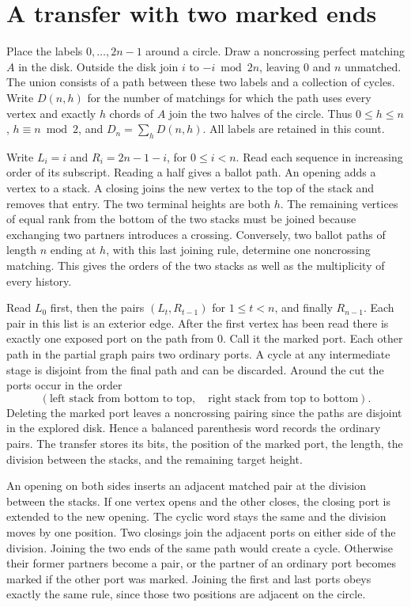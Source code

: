 \section{A transfer with two marked ends}
\label{sec:axis-transfer}

Place the labels \(0,\ldots,2n-1\) around a circle. Draw a noncrossing
perfect matching \(A\) in the disk. Outside the disk join \(i\) to
\(-i\bmod 2n\), leaving \(0\) and \(n\) unmatched. The union consists of a
path between these two labels and a collection of cycles. Write
\(D(n,h)\) for the number of matchings for which the path uses every vertex
and exactly \(h\) chords of \(A\) join the two halves of the circle. Thus
\(0\le h\le n\), \(h\equiv n\bmod 2\), and \(D_n=\sum_h D(n,h)\).
All labels are retained in this count.

Write \(L_i=i\) and \(R_i=2n-1-i\), for \(0\le i<n\). Read each sequence
in increasing order of its subscript. Reading a half gives a ballot path.
An opening adds a vertex to a stack. A closing joins the new vertex to
the top of the stack and removes that entry. The two terminal heights are
both \(h\). The remaining vertices of equal rank from the bottom of the
two stacks must be joined because exchanging two partners introduces a crossing.
Conversely, two ballot paths of length \(n\) ending at \(h\), with this
last joining rule, determine one noncrossing matching. This gives the
orders of the two stacks as well as the multiplicity of every history.

Read \(L_0\) first, then the pairs \((L_t,R_{t-1})\) for \(1\le t<n\),
and finally \(R_{n-1}\). Each pair in this list is an exterior edge.
After the first vertex has been read there is exactly one exposed port
on the path from \(0\). Call it the marked port. Each other path in the
partial graph pairs two ordinary ports. A cycle at any intermediate
stage is disjoint from the final path and can be discarded. Around the
cut the ports occur in the order
\[
  (\text{left stack from bottom to top},\quad
   \text{right stack from top to bottom}).
\]
Deleting the marked port leaves a noncrossing pairing since the paths are
disjoint in the explored disk. Hence a balanced parenthesis word records
the ordinary pairs. The transfer stores its bits, the position of the
marked port, the length, the division between the stacks, and the
remaining target height.

An opening on both sides inserts an adjacent matched pair at the division
between the stacks. If one vertex opens and the other closes, the closing
port is extended to the new opening. The cyclic word stays the same and
the division moves by one position. Two closings join the adjacent ports
on either side of the division. Joining the two ends of the same path
would create a cycle. Otherwise their former partners become a pair, or
the partner of an ordinary port becomes marked if the other port was
marked. Joining the first and last ports obeys exactly the same rule,
since those two positions are adjacent on the circle.

